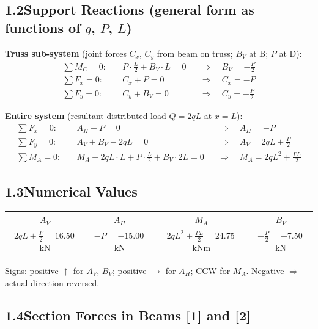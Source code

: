 \documentclass[a4paper,11pt]{article}
\begin{document}
\subsection*{1.2\quad Support Reactions (general form as functions of $q$, $P$, $L$)}

\textbf{Truss sub-system}
(joint forces $C_x$, $C_y$ from beam on truss; $B_V$ at B; $P$ at D):
\begin{align*}
  \sum M_C = 0:\quad & P \cdot \tfrac{L}{2} + B_V \cdot L = 0
    &&\Rightarrow\quad \boxed{B_V = -\tfrac{P}{2}} \\
  \sum F_x = 0:\quad & C_x + P = 0
    &&\Rightarrow\quad C_x = -P \\
  \sum F_y = 0:\quad & C_y + B_V = 0
    &&\Rightarrow\quad C_y = +\tfrac{P}{2}
\end{align*}

\textbf{Entire system} (resultant distributed load $Q = 2qL$ at $x = L$):
\begin{align*}
  \sum F_x = 0:\quad & A_H + P = 0
    &&\Rightarrow\quad \boxed{A_H = -P} \\
  \sum F_y = 0:\quad & A_V + B_V - 2qL = 0
    &&\Rightarrow\quad \boxed{A_V = 2qL + \tfrac{P}{2}} \\
  \sum M_A = 0:\quad & M_A - 2qL \cdot L + P\cdot\tfrac{L}{2} + B_V \cdot 2L = 0
    &&\Rightarrow\quad \boxed{M_A = 2qL^2 + \tfrac{PL}{2}}
\end{align*}

\subsection*{1.3\quad Numerical Values}

\begin{center}
\begin{tabular}{cccc}
\toprule
$A_V$ & $A_H$ & $M_A$ & $B_V$ \\
\midrule
$2qL + \tfrac{P}{2} = \mathbf{16.50}$\,kN
& $-P = \mathbf{-15.00}$\,kN
& $2qL^2 + \tfrac{PL}{2} = \mathbf{24.75}$\,kNm
& $-\tfrac{P}{2} = \mathbf{-7.50}$\,kN \\
\bottomrule
\end{tabular}
\end{center}

Signs: positive $\uparrow$ for $A_V$, $B_V$; positive $\rightarrow$ for $A_H$;
CCW for $M_A$. Negative $\Rightarrow$ actual direction reversed.

\subsection*{1.4\quad Section Forces in Beams [1] and [2]}
\end{document}
